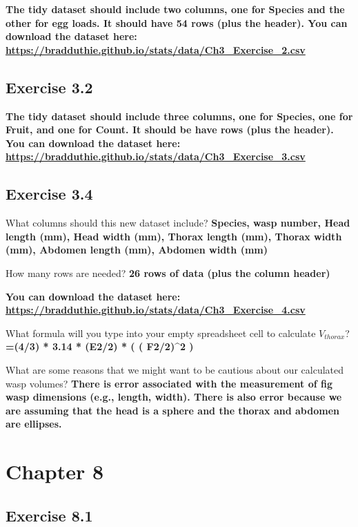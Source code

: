 \documentclass[
  openany]{scrbook}
\begin{document}
\textbf{The tidy dataset should include two columns, one for Species and the other for egg loads. It should have 54 rows (plus the header). You can download the dataset here: \url{https://bradduthie.github.io/stats/data/Ch3_Exercise_2.csv}}

\hypertarget{exercise-3.2-1}{%
\subsection{Exercise 3.2}\label{exercise-3.2-1}}

\textbf{The tidy dataset should include three columns, one for Species, one for Fruit, and one for Count. It should be have rows (plus the header). You can download the dataset here: \url{https://bradduthie.github.io/stats/data/Ch3_Exercise_3.csv}}

\hypertarget{exercise-3.4}{%
\subsection{Exercise 3.4}\label{exercise-3.4}}

What columns should this new dataset include? \textbf{Species, wasp number, Head length (mm), Head width (mm), Thorax length (mm), Thorax width (mm), Abdomen length (mm), Abdomen width (mm)}

How many rows are needed? \textbf{26 rows of data (plus the column header)}

\textbf{You can download the dataset here: \url{https://bradduthie.github.io/stats/data/Ch3_Exercise_4.csv}}

What formula will you type into your empty spreadsheet cell to calculate \(V_{thorax}\)? \textbf{=(4/3) * 3.14 * (E2/2) * ( ( F2/2)\^{}2 )}

What are some reasons that we might want to be cautious about our calculated wasp volumes? \textbf{There is error associated with the measurement of fig wasp dimensions (e.g., length, width). There is also error because we are assuming that the head is a sphere and the thorax and abdomen are ellipses.}

\hypertarget{chapter-8}{%
\section{Chapter 8}\label{chapter-8}}

\hypertarget{exercise-8.1}{%
\subsection{Exercise 8.1}\label{exercise-8.1}}
\end{document}
